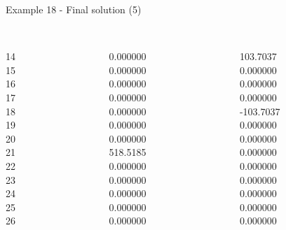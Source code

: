 \begin{frame}{Example 18 - Final solution (5)}
\begin{columns}[t]
\begin{column}{0.3\textwidth}
\\

14\\
15\\
16\\
17\\
18\\
19\\
20\\
21\\
22\\
23\\
24\\
25\\
26\\

\end{column}
\begin{column}{0.3\textwidth}
\\
0.000000\\
0.000000\\
0.000000\\
0.000000\\
0.000000\\
0.000000\\
0.000000\\
518.5185\\
0.000000\\
0.000000\\
0.000000\\
0.000000\\
0.000000\\

\end{column}

\begin{column}{0.3\textwidth}
\\

103.7037\\
0.000000\\
0.000000\\
0.000000\\
-103.7037\\
0.000000\\
0.000000\\
0.000000\\
0.000000\\
0.000000\\
0.000000\\
0.000000\\
0.000000\\
\end{column}
\end{columns}
\end{frame}


